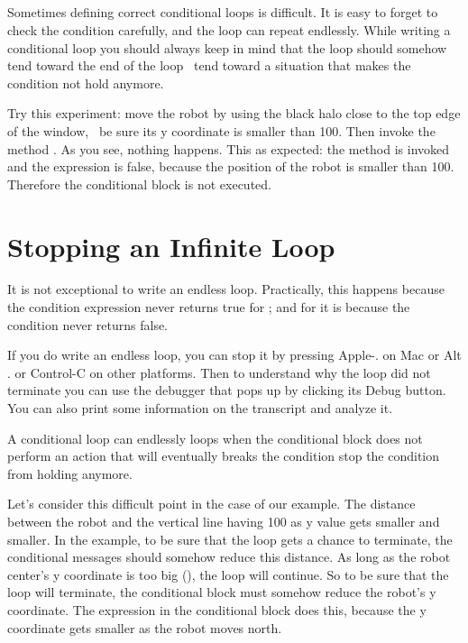 \subsection*{}
Sometimes defining correct conditional loops is difficult. It is easy to forget to check the condition carefully, and the loop can repeat endlessly. While writing a conditional loop you should always keep in mind that the loop should somehow tend toward the end of the loop \ie\ tend toward a situation that makes the condition not hold anymore. 

Try this experiment: move the robot by using the black halo close to the top edge of the window, \ie\ be sure its y coordinate is smaller than 100. Then invoke the method .  As you see, nothing happens. This as expected: the method is invoked and the expression  is false, because the position of the robot is smaller than 100. Therefore the conditional block is not executed. 


\section{Stopping an Infinite Loop}
It is not exceptional to write an endless loop. Practically, this happens because the condition expression never returns true for ; and for   it is because the condition never returns false. 

If you do write an endless loop, you can stop  it by pressing Apple-. on Mac or Alt . or Control-C on other platforms. Then to understand why the loop did not terminate you can use the debugger that pops up by clicking its Debug button. You can also print some information on the transcript and analyze it.

A conditional loop can endlessly loops when the conditional block does not perform an action that will eventually breaks the condition \ie stop the condition from holding anymore. 

Let's consider this difficult point in the case of our example.  The distance between the robot and the vertical line having 100 as y value gets smaller and smaller. In the example, to be sure that the loop gets a chance to terminate,  the conditional messages should somehow reduce this distance. As long as the robot center's y coordinate is too big (), the loop will continue. So to be sure that the loop will terminate, the conditional block must somehow reduce the robot's y coordinate.  The expression  in the conditional block does this, because the y coordinate gets smaller as the robot moves north.

